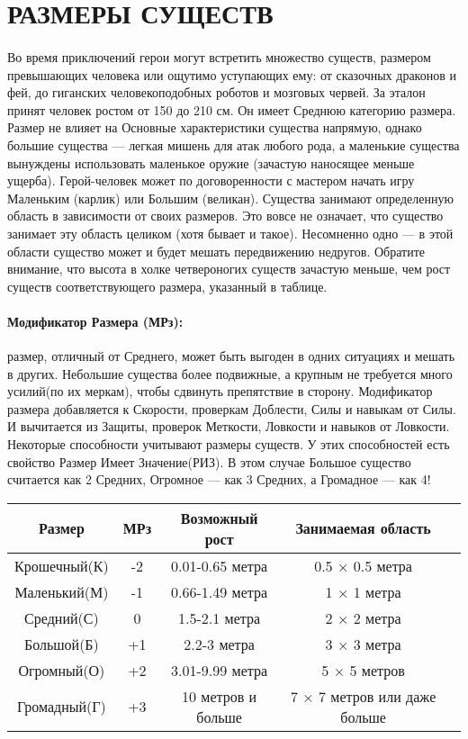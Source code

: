 \section{РАЗМЕРЫ СУЩЕСТВ}
\paragraph{}
Во время приключений герои могут встретить множество существ, размером превышающих человека или ощутимо уступающих ему: от сказочных драконов и фей, до гиганских человекоподобных роботов и мозговых червей. За эталон принят человек ростом от 150 до 210 см. Он имеет Среднюю категорию размера. Размер не влияет на Основные характеристики существа напрямую, однако большие существа — легкая мишень для атак любого рода, а маленькие существа вынуждены использовать маленькое оружие (зачастую наносящее меньше ущерба). Герой-человек может по договоренности с мастером начать игру Маленьким (карлик) или Большим (великан).
\newline
Существа занимают определенную область в зависимости от своих размеров. Это вовсе не означает, что существо занимает эту область целиком (хотя бывает и такое). Несомненно одно — в этой области существо может и будет мешать передвижению недругов. Обратите внимание, что высота в холке четвероногих существ зачастую меньше, чем рост существ соответствующего размера, указанный в таблице.
\paragraph{Модификатор Размера (МРз):} размер, отличный от Среднего, может быть выгоден в одних ситуациях и мешать в других. Небольшие существа более подвижные, а крупным не требуется много усилий(по их меркам), чтобы сдвинуть препятствие в сторону.
\newline
Модификатор размера добавляется к Скорости, проверкам Доблести, Силы и навыкам от Силы. И вычитается из Защиты, проверок Меткости, Ловкости и навыков от Ловкости.
\newline
Некоторые способности учитывают размеры существ. У этих способностей есть свойство Размер Имеет Значение(РИЗ). В этом случае Большое существо считается как 2 Средних, Огромное — как 3 Средних, а Громадное — как 4!
\begin{center}
\begin{tabular}{ |c|c|c|c|c| }
\hline
Размер & МРз & Возможный рост & Занимаемая область
\\ \hline
Крошечный(К) & -2 & 0.01-0.65 метра & 0.5 × 0.5 метра
\\ \hline
Маленький(М) & -1 & 0.66-1.49 метра & 1 × 1 метра
\\ \hline
Средний(С) & 0 & 1.5-2.1 метра & 2 × 2 метра
\\ \hline
Большой(Б) & +1 & 2.2-3 метра & 3 × 3 метра
\\ \hline
Огромный(О) & +2 & 3.01-9.99 метра & 5 × 5 метров
\\ \hline
Громадный(Г) & +3 & 10 метров и больше & 7 × 7 метров или даже больше
\\ \hline
\end{tabular}
\end{center}
